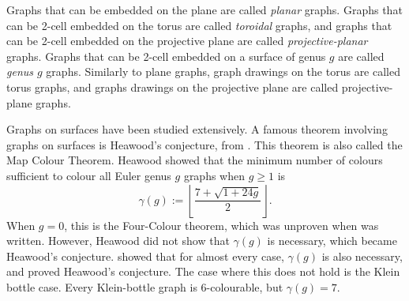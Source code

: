 Graphs that can be embedded on the plane are called \textit{planar} graphs. Graphs that can be 2-cell embedded on the torus are called \textit{toroidal} graphs, and graphs that can be 2-cell embedded on the projective plane are called \textit{projective-planar} graphs. Graphs that can be 2-cell embedded on a surface of genus $g$ are called \textit{genus $g$} graphs. Similarly to plane graphs, graph drawings on the torus are called torus graphs, and graphs drawings on the projective plane are called projective-plane graphs. 

Graphs on surfaces have been studied extensively. A famous theorem involving graphs on surfaces is Heawood's conjecture, from \textcite{heawoodMapcolourTheorem1890}. This theorem is also called the Map Colour Theorem. Heawood showed that the minimum number of colours sufficient to colour all Euler genus $g$ graphs when $g \geq 1$ is
	\begin{equation*}
		\gamma(g) := \left\lfloor 
		\frac{7 + \sqrt{1 + 24g}}{2}
		\right\rfloor.
	\end{equation*}
When $g = 0$, this is the Four-Colour theorem, which was unproven when \textcite{ringelMapColorTheorem1974} was written.  
However, Heawood did not show that $\gamma(g)$ is necessary, which became Heawood's conjecture. 
\textcite{ringelMapColorTheorem1974} showed that for almost every case, $\gamma(g)$ is also necessary, and proved Heawood's conjecture. The case where this does not hold is the Klein bottle case. Every Klein-bottle graph is $6$-colourable, but $\gamma(g) = 7$. 